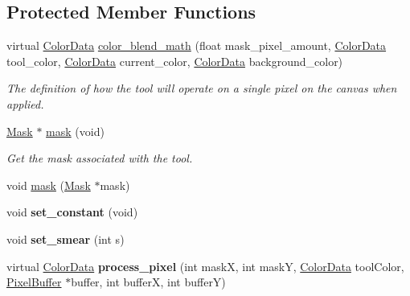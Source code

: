\subsection*{Protected Member Functions}
\begin{DoxyCompactItemize}
\item 
virtual \hyperlink{classimage__tools_1_1ColorData}{Color\+Data} \hyperlink{classimage__tools_1_1Tool_adca00cc3d94a4ca7bdf15d323754e105}{color\+\_\+blend\+\_\+math} (float mask\+\_\+pixel\+\_\+amount, \hyperlink{classimage__tools_1_1ColorData}{Color\+Data} tool\+\_\+color, \hyperlink{classimage__tools_1_1ColorData}{Color\+Data} current\+\_\+color, \hyperlink{classimage__tools_1_1ColorData}{Color\+Data} background\+\_\+color)
\begin{DoxyCompactList}\small\item\em The definition of how the tool will operate on a single pixel on the canvas when applied. \end{DoxyCompactList}\item 
\hyperlink{classimage__tools_1_1Mask}{Mask} $\ast$ \hyperlink{classimage__tools_1_1Tool_a3002c5364aa984eec6e25a1c842dae2f}{mask} (void)
\begin{DoxyCompactList}\small\item\em Get the mask associated with the tool. \end{DoxyCompactList}\item 
void \hyperlink{classimage__tools_1_1Tool_a18145cb816dd3d56f87f4ddab7ce3ab3}{mask} (\hyperlink{classimage__tools_1_1Mask}{Mask} $\ast$mask)
\item 
void {\bfseries set\+\_\+constant} (void)\hypertarget{classimage__tools_1_1Tool_ab3a25d0708b0c4cd36b9545a3c22531a}{}\label{classimage__tools_1_1Tool_ab3a25d0708b0c4cd36b9545a3c22531a}

\item 
void {\bfseries set\+\_\+smear} (int s)\hypertarget{classimage__tools_1_1Tool_a7a388418aa1df58f39347f07728db81a}{}\label{classimage__tools_1_1Tool_a7a388418aa1df58f39347f07728db81a}

\item 
virtual \hyperlink{classimage__tools_1_1ColorData}{Color\+Data} {\bfseries process\+\_\+pixel} (int maskX, int maskY, \hyperlink{classimage__tools_1_1ColorData}{Color\+Data} tool\+Color, \hyperlink{classimage__tools_1_1PixelBuffer}{Pixel\+Buffer} $\ast$buffer, int bufferX, int bufferY)\hypertarget{classimage__tools_1_1Tool_a9e601f030f0956796810616445e395f0}{}\label{classimage__tools_1_1Tool_a9e601f030f0956796810616445e395f0}

\end{DoxyCompactItemize}

